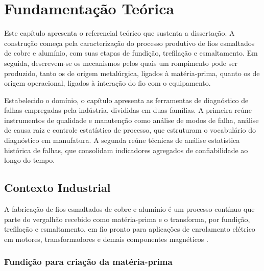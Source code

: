 \chapter{Fundamentação Teórica}
\label{cap:fundamentacao}


Este capítulo apresenta o referencial teórico que sustenta a dissertação. A construção começa pela caracterização do processo produtivo de fios esmaltados de cobre e alumínio, com suas etapas de fundição, trefilação e esmaltamento. Em seguida, descrevem-se os mecanismos pelos quais um rompimento pode ser produzido, tanto os de origem metalúrgica, ligados à matéria-prima, quanto os de origem operacional, ligados à interação do fio com o equipamento.

Estabelecido o domínio, o capítulo apresenta as ferramentas de diagnóstico de falhas empregadas pela indústria, divididas em duas famílias. A primeira reúne instrumentos de qualidade e manutenção como análise de modos de falha, análise de causa raiz e controle estatístico de processo, que estruturam o vocabulário do diagnóstico em manufatura. A segunda reúne técnicas de análise estatística histórica de falhas, que consolidam indicadores agregados de confiabilidade ao longo do tempo.


\section{Contexto Industrial}
\label{sec:contexto_industrial}

A fabricação de fios esmaltados de cobre e alumínio é um processo contínuo que parte do vergalhão recebido como matéria-prima e o transforma, por fundição, trefilação e esmaltamento, em fio pronto para aplicações de enrolamento elétrico em motores, transformadores e demais componentes magnéticos \cite{demiri2014enamel,niu2024superior,caruso2022novel}.


\subsection{Fundição para criação da matéria-prima}
\label{subsec:fundicao}

